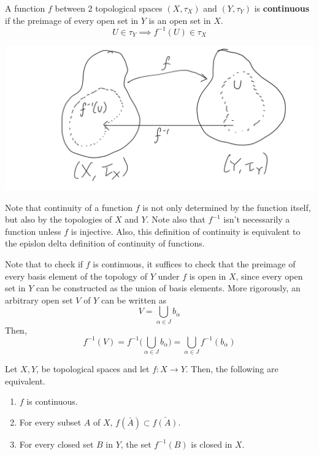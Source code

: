 \documentclass{article}
\begin{document}
    \begin{definition}
    A function $f$ between 2 topological spaces $(X, \tau_{X})$ and $(Y, \tau_{Y})$ is \textbf{continuous} if the preimage of every open set in $Y$ is an open set in $X$.
    \[ U \in \tau_{Y} \implies f^{-1}(U) \in \tau_{X}\]
    \begin{center}    \includegraphics[scale=0.20]{img/Topological_Continuity_of_Functions.PNG}
    \end{center}
    Note that continuity of a function $f$ is not only determined by the function itself, but also by the topologies of $X$ and $Y$. Note also that $f^{-1}$ isn't necessarily a function unless $f$ is injective. Also, this definition of continuity is equivalent to the epislon delta definition of continuity of functions. 
    \end{definition}

    Note that to check if $f$ is continuous, it suffices to check that the preimage of every basis element of the topology of $Y$ under $f$ is open in $X$, since every open set in $Y$ can be constructed as the union of basis elements. More rigorously, an arbitrary open set $V$ of $Y$ can be written as 
    \[V = \bigcup_{\alpha \in J} b_\alpha\]
    Then, 
    \[f^{-1} (V) = f^{-1} \Big( \bigcup_{\alpha \in J} b_\alpha \Big) = \bigcup_{\alpha \in J} f^{-1} (b_\alpha)\]

    \begin{theorem}
    Let $X, Y$, be topological spaces and let $f: X \longrightarrow Y$. Then, the following are equivalent. 
    \begin{enumerate}
        \item $f$ is continuous. 
        \item For every subset $A$ of $X$, $f(\bar{A}) \subset \bar{f(A)}$. 
        \item For every closed set $B$ in $Y$, the set $f^{-1} (B)$ is closed in $X$. 
    \end{enumerate}
    \end{theorem}
\end{document}
